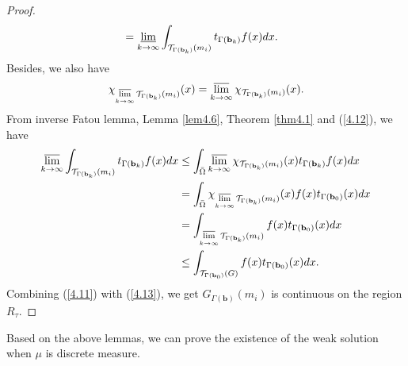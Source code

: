 \documentclass[a4paper,12pt,]{article}
\numberwithin{equation}{section}
\numberwithin{equation}{section} \allowdisplaybreaks
\begin{document}
\begin{proof}
\begin{equation}
\begin{aligned}
    & = \varliminf\limits_{k \rightarrow \infty} \int_{\mathcal{T}_{\Gamma({\mathbf{b}_{k}})}(m_{i})}t_{\Gamma({\mathbf{b}_{k}})}f(x)dx.
    \end{aligned}
  \end{equation}
  Besides, we also have
  \begin{equation}\label{4.12}
    \chi_{\varlimsup\limits_{k \rightarrow \infty} \mathcal{T}_{\Gamma({\mathbf{b}_{k}})}(m_{i})}(x) = \varlimsup\limits_{k \rightarrow \infty} \chi_{\mathcal{T}_{\Gamma({\mathbf{b}_{k}})}(m_{i})}(x).
  \end{equation}
  From inverse Fatou lemma, Lemma \ref{lem4.6}, Theorem \ref{thm4.1} and (\ref{4.12}), we have
  \begin{equation}\label{4.13}
    \begin{aligned}
     \varlimsup\limits_{k \rightarrow \infty} \int_{\mathcal{T}_{\Gamma({\mathbf{b}_{k}})}(m_{i})}t_{\Gamma({\mathbf{b}_{k}})}f(x)dx  & \leq \int_{\bar{\Omega}}\varlimsup\limits_{k \rightarrow \infty} \chi_{\mathcal{T}_{\Gamma({\mathbf{b}_{k}})}(m_{i})}(x)t_{\Gamma({\mathbf{b}_{k}})}f(x)dx  \\
     & = \int_{\bar{\Omega}}\chi_{\varlimsup\limits_{k \rightarrow \infty} \mathcal{T}_{\Gamma({\mathbf{b}_{k}})}(m_{i})}(x)f(x)t_{\Gamma(\mathbf{b}_{0})}(x)dx \\
     & = \int_{\varlimsup\limits_{k \rightarrow \infty} \mathcal{T}_{\Gamma({\mathbf{b}_{k}})}(m_{i})}f(x)t_{\Gamma(\mathbf{b}_{0})}(x)dx \\
     & \leq \int_{\mathcal{T}_{\Gamma({\mathbf{b}_{0}})}(G)}f(x)t_{\Gamma(\mathbf{b}_{0})}(x)dx.
    \end{aligned}
  \end{equation}
  Combining (\ref{4.11}) with (\ref{4.13}), we get $G_{\Gamma(\mathbf{b})}(m_{i})$ is continuous on the region $R_{\tau}$.
\end{proof}

Based on the above lemmas, we can prove the existence of the weak solution when $\mu$ is discrete measure.
\end{document}
